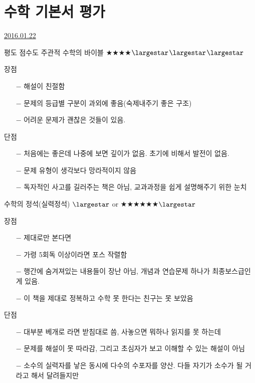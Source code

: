 \section{수학 기본서 평가}
\href{https://www.kockoc.com/Apoc/604542}{2016.01.22}

\vspace{5mm}

평도 점수도 주관적
\vspace{5mm}
수학의 바이블 $\bigstar$$\bigstar$$\bigstar$$\bigstar$$\largestar$$\largestar$$\largestar$
\vspace{5mm}

장점
\begin{itemize}
    \item[$-$] 해설이 친절함
    \item[$-$] 문제의 등급별 구분이 과외에 좋음(숙제내주기 좋은 구조)
    \item[$-$] 어려운 문제가 괜찮은 것들이 있음.
\end{itemize}
\vspace{5mm}

단점
\begin{itemize}
    \item[$-$] 처음에는 좋은데 나중에 보면 깊이가 없음. 초기에 비해서 발전이 없음.
    \item[$-$] 문제 유형이 생각보다 망라적이지 않음
    \item[$-$] 독자적인 사고를 길러주는 책은 아님, 교과과정을 쉽게 설명해주기 위한 눈치
\end{itemize}
\vspace{5mm}

수학의 정석(실력정석) $\largestar$ or $\bigstar$$\bigstar$$\bigstar$$\bigstar$$\bigstar$$\bigstar$$\largestar$
\vspace{5mm}

장점
\begin{itemize}
    \item[$-$] 제대로만 본다면 \item[$-$] 가령 5회독 이상이라면 포스 작렬함
    \item[$-$] 행간에 숨겨져있는 내용들이 장난 아님, 개념과 연습문제 하나가 최종보스급인 게 있음.
    \item[$-$] 이 책을 제대로 정복하고 수학 못 한다는 친구는 못 보았음
\end{itemize}
\vspace{5mm}

단점
\begin{itemize}
    \item[$-$] 대부분 베개로 라면 받침대로 씀, 사놓으면 뭐하나 읽지를 못 하는데
    \item[$-$] 문제를 해설이 못 따라감, 그리고 초심자가 보고 이해할 수 있는 해설이 아님
    \item[$-$] 소수의 실력자를 낳은 동시에 다수의 수포자를 양산. 다들 자기가 소수가 될 거라고 해서 달려들지만
\end{itemize}
\vspace{5mm}

